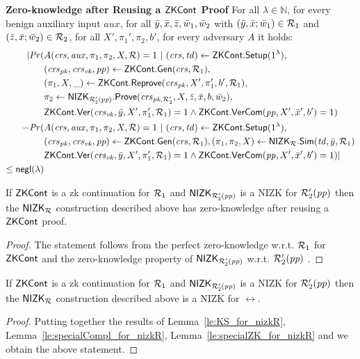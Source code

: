 \noindent \textbf{Zero-knowledge after Reusing a ${\mathsf{ZKCont}}$ Proof} For all $\lambda \in \mathbb{N}$, for every benign auxiliary input $aux$, 
for all $\bar{y},\bar{x},\bar{z}, \bar{w}_1, \bar{w}_2$ with $(\bar{y}, \bar{x}; \bar{w}_1) \in \mathcal{R}_1$ and $(\bar{z}, \bar{x}; \bar{w}_2) \in \mathcal{R}_2$, for all $X',\pi_1',\pi_2, b'$, for every adversary $A$ it holds:
\begin{align*}
| \mathit{Pr}(& A(\crs, \realaux, \pi_1,\pi_2, X, \rel) = 1 \ | \ (\crs, \tw) \leftarrow \ZKCont.\Setup (1^{\lambda}), \\
                  & (\crspk, \crsvk, \pp) \leftarrow \ZKCont.\Gen(\crs, \relone), \\
                  &(\pi_1, X, \_) \leftarrow \ZKCont.\Reprove (\crspk, X', \pi_1', b', \relone), \\
                  & \pi_2 \leftarrow \nizktwo.\Prove(\crspktwo, X, \barz, \barx, b, \baromega_2), \\
                  &  \ZKCont.\Verify(\crsvk, \bary, X', \pi'_1, \relone) = 1 
                  \wedge \ZKCont.\VerifyCom(\pp, X', \barx', b') = 1)   \\
- \mathit{Pr}(& A(\crs, \realaux, \pi_1,\pi_2, X, \rel) = 1 \ | \ (\crs, \tw) \leftarrow \ZKCont.\Setup (1^{\lambda}), \\ 
                     & (\crspk, \crsvk, \pp) \leftarrow \ZKCont.\Gen(\crs, \relone), (\pi_1,\pi_2, X) \leftarrow \nizkR.\Sim(\tw, \bary, \relone) \\ 
                     &  \ZKCont.\Verify(\crsvk, \bary, X', \pi'_1, \relone) = 1
                    \wedge \ZKCont.\VerifyCom(\pp, X', \barx', b') = 1) | \\
                    \leq \negl(\lambda)
\end{align*}

\begin{lemma} 
\label{le:specialZK_for_nizkR}
If ${\mathsf{ZKCont}}$ is a zk continuation for $\mathcal{R}_1$ and ${\mathsf{NIZK_{\mathcal{R}'_2(\mathit{pp})}}}$ is a NIZK for $\mathcal{R}_2'(\mathit{pp})$ 
then the ${\mathsf{NIZK_{\mathcal{R}}}}$ construction described above has zero-knowledge after reusing a ${\mathsf{ZKCont}}$ proof.
\end{lemma} 
\begin{proof} The statement follows from the perfect zero-knowledge w.r.t. $\mathcal{R}_1$ for ${\mathsf{ZKCont}}$ and 
the zero-knowledge property of ${\mathsf{NIZK_{\mathcal{R}'_2(\mathit{pp})}}}$ w.r.t. $\mathcal{R}_2'(\mathit{pp})$ .
\end{proof}
 
\begin{corollary}
If ${\mathsf{ZKCont}}$ is a zk continuation for $\mathcal{R}_1$ and ${\mathsf{NIZK_{\mathcal{R}'_2(\mathit{pp})}}}$ is a NIZK for $\mathcal{R}_2'(\mathit{pp})$ 
then the ${\mathsf{NIZK_{\mathcal{R}}}}$ construction described above is a NIZK for $\rel$.
 \end{corollary}
 
\begin{proof} Putting together the results of Lemma~\ref{le:KS_for_nizkR}, Lemma~\ref{le:specialCompl_for_nizkR}, 
Lemma~\ref{le:specialZK_for_nizkR} and  we obtain the above statement.
\end{proof} 

